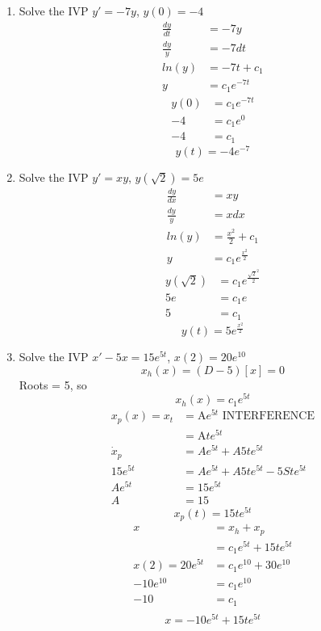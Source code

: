 \documentclass{article}
\begin{document}
\begin{enumerate}
    \item Solve the IVP $y' = -7y$, $y(0) = -4$
    \begin{align*}
        \frac{dy}{dt} &= -7y \\
        \frac{dy}{y} &= -7 dt\\
        ln(y)        &= -7t + c_1 \\
        y            &= c_1 e^{-7t}
    \end{align*}
    \begin{align*}
        y(0) &= c_1 e^{-7t} \\
          -4 &= c_1 e^0 \\
          -4 &= c_1
    \end{align*}
    $$y(t) = -4 e^{-7}$$
    
    \item Solve the IVP $y' = xy$, $y(\sqrt{2}) = 5e$
    \begin{align*}
        \frac{dy}{dx} &= xy \\
        \frac{dy}{y} &= x dx\\
        ln(y)        &= \frac{x^2}{2} + c_1 \\
        y            &= c_1 e^{\frac{x^2}{2}}
    \end{align*}
    \begin{align*}
        y(\sqrt{2}) &= c_1 e^{\frac{\sqrt{2}^2}{2}} \\
          5e &= c_1 e \\
          5  &= c_1
    \end{align*}
    $$y(t) = 5  e^{\frac{x^2}{2}}$$
    
\item Solve the IVP $x' -5x = 15e^{5t}$, $x(2) = 20 e^{10}$
    $$x_h(x) = (D-5)[x] = 0$$
    Roots = 5, so
    $$x_h(x) = c_1 e^{5t}$$
    \begin{align*}
        x_p(x) = x_t &= \text{A} e^{5t} \text{  INTERFERENCE} \\
                     &= \text{A} t e^{5t} \\
         \dot{x}_p   &= Ae^{5t} + A5te^{5t} \\
         15 e^{5t}   &= Ae^{5t} + A5te^{5t} - 5Ste^{5t} \\
             Ae^{5t} &= 15e^{5t} \\
                   A &= 15
    \end{align*}
    $$x_p(t) = 15te^{5t}$$
    \begin{align*}
                  x &= x_h + x_p \\
                    &= c_1e^{5t} + 15te^{5t}\\
    x(2) = 20e^{5t} &= c_1e^{10} + 30e^{10} \\
        -10e^{10}   &= c_1e^{10} \\
                -10 &= c_1 \\
    \end{align*}
    $$x = -10 e^{5t} + 15 t e^{5t}$$
    
\end{enumerate}
\end{document}
